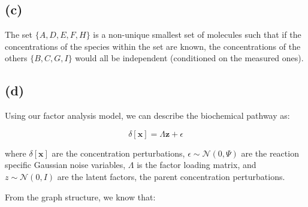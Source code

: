 \documentclass[12pt]{article}
\begin{document}
\subsection*{(c)}

\begin{center}
\end{center}


The set $\{A, D, E, F, H\}$ is a non-unique smallest set of molecules such that if the concentrations of the species within the set are known, the concentrations of the others $\{B, C, G, I\}$ would all be independent (conditioned on the measured ones).


\subsection*{(d)}

Using our factor analysis model, we can describe the biochemical pathway as:

\[\delta[\textbf{x}] = \Lambda \textbf{z} + \epsilon\]

where $\delta[\textbf{x}]$ are the concentration perturbations, $\epsilon \sim \mathcal{N} (0, \Psi)$ are the reaction specific Gaussian noise variables, $\Lambda$ is the factor loading matrix, and $z \sim \mathcal{N} (0, I)$ are the latent factors, the parent concentration perturbations.

From the graph structure, we know that:
\end{document}
